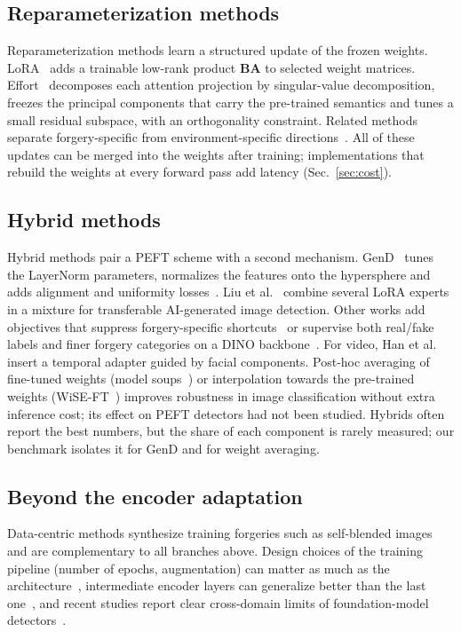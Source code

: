 \documentclass[fonts]{icst}
\begin{document}
\subsection{Reparameterization methods}
Reparameterization methods learn a structured update of the frozen weights. LoRA~\cite{hu2022lora} adds a trainable low-rank product $\mathbf{B}\mathbf{A}$ to selected weight matrices. Effort~\cite{yan2025effort} decomposes each attention projection by singular-value decomposition, freezes the principal components that carry the pre-trained semantics and tunes a small residual subspace, with an orthogonality constraint. Related methods separate forgery-specific from environment-specific directions~\cite{chen2026envsubspace}. All of these updates can be merged into the weights after training; implementations that rebuild the weights at every forward pass add latency (Sec.~\ref{sec:cost}).

\subsection{Hybrid methods}
Hybrid methods pair a PEFT scheme with a second mechanism. GenD~\cite{yermakov2025gend} tunes the LayerNorm parameters, normalizes the features onto the hypersphere and adds alignment and uniformity losses~\cite{wang2020alignment}. Liu et al.~\cite{liu2024mole} combine several LoRA experts in a mixture for transferable AI-generated image detection. Other works add objectives that suppress forgery-specific shortcuts~\cite{wang2026shortcut} or supervise both real/fake labels and finer forgery categories on a DINO backbone~\cite{zhang2026dino}. For video, Han et al.~\cite{han2024fcg} insert a temporal adapter guided by facial components. Post-hoc averaging of fine-tuned weights (model soups~\cite{wortsman2022soups}) or interpolation towards the pre-trained weights (WiSE-FT~\cite{wortsman2022wiseft}) improves robustness in image classification without extra inference cost; its effect on PEFT detectors had not been studied. Hybrids often report the best numbers, but the share of each component is rarely measured; our benchmark isolates it for GenD and for weight averaging.

\subsection{Beyond the encoder adaptation}
Data-centric methods synthesize training forgeries such as self-blended images~\cite{shiohara2022sbi,chen2022sladd,lin2024cdfa} and are complementary to all branches above. Design choices of the training pipeline (number of epochs, augmentation) can matter as much as the architecture~\cite{pellegrini2025design}, intermediate encoder layers can generalize better than the last one~\cite{park2025mold}, and recent studies report clear cross-domain limits of foundation-model detectors~\cite{delibasoglu2026limits}.
\end{document}
